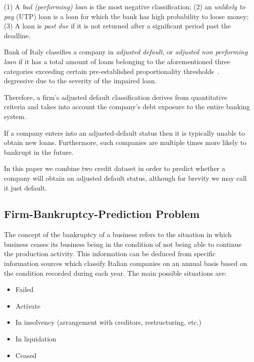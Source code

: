 (1) A \emph{bad (performing) loan} is the most negative classification;
(2) an \emph{unlikely to pay} (UTP) loan is a loan for which the bank
has high probability to loose money; (3) A loan is \emph{past due} if it
is not returned after a significant period past the deadline.

Bank of Italy classifies a company in \emph{adjusted default}, or
\emph{adjusted non performing loan} if it has a total
amount of loans belonging to the aforementioned three categories exceeding
certain pre-established proportionality thresholds~\cite{adjusted-default-def}.
 degressive due to the severity of the impaired loan. 
 
Therefore, a firm's adjusted default classification derives from
quantitative criteria and takes into account the company's debt exposure
to the entire banking system.

If a company enters into an adjusted-default status then it is typically
unable to obtain new loans. Furthermore, such companies are multiple
times more likely to bankrupt in the future.

In this paper we  combine two credit dataset in order to predict whether a company will obtain an adjusted default status, although for brevity we may call it just
default. 


\subsection{Firm-Bankruptcy-Prediction Problem}
The concept of the bankruptcy of a business refers to the situation in which business ceases its business being in the condition of not being able to continue the production activity.
This information can be deduced from specific information sources which classify Italian companies on an annual basis based on the condition recorded during each year. The main possible situations are:

\begin{itemize}
\item  Failed
\item  Activate
\item  In insolvency (arrangement with creditors, restructuring, etc.)
\item  In liquidation
\item  Ceased

\end{itemize}


